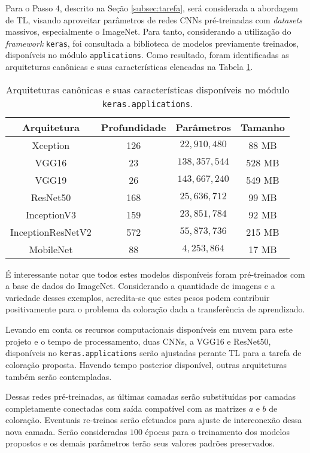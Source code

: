 Para o Passo 4, descrito na Seção \ref{subsec:tarefa}, será considerada a abordagem de TL, visando aproveitar parâmetros de redes CNNs pré-treinadas com \emph{datasets} massivos, especialmente o ImageNet. Para tanto, considerando a utilização do \emph{framework} \texttt{keras}, foi consultada a biblioteca de modelos previamente treinados, disponíveis no módulo \texttt{applications}. Como resultado, foram identificadas as arquiteturas canônicas e suas características elencadas na Tabela \ref{tab:cnns}.

\begin{table}[!ht]
	\caption{Arquiteturas canônicas e suas características disponíveis no módulo \texttt{keras.applications}.}
	\centering
	\begin{tabular}{c c c c}
		\toprule
		 Arquitetura & Profundidade & Parâmetros & Tamanho \\
		\midrule
		Xception & 126 & $22,910,480$ & 88 MB \\
		VGG16 & 23 & $138,357,544$ & 528 MB \\
		VGG19 & 26 & $143,667,240$ & 549 MB \\
		ResNet50 & 168 & $25,636,712$ & 99 MB \\
		InceptionV3 & 159 & $23,851,784$ & 92 MB \\
		InceptionResNetV2 & 572 & $55,873,736$ & 215 MB \\
		MobileNet & 88 & $4,253,864$ & 17 MB \\
		\bottomrule
	\end{tabular}

	\label{tab:cnns}
\end{table}

É interessante notar que todos estes modelos disponíveis foram pré-treinados com a base de dados do ImageNet. Considerando a quantidade de imagens e a variedade desses exemplos, acredita-se que estes pesos podem contribuir positivamente para o problema da coloração dada a transferência de aprendizado.

Levando em conta os recursos computacionais disponíveis em nuvem para este projeto e o tempo de processamento, duas CNNs, a VGG16 e ResNet50, disponíveis no \texttt{keras.applications} serão ajustadas perante TL para a tarefa de coloração proposta. Havendo tempo posterior disponível, outras arquiteturas também serão contempladas.

Dessas redes pré-treinadas, as últimas camadas serão substituídas por camadas completamente conectadas com saída compatível com as matrizes $a$ e $b$ de coloração. Eventuais re-treinos serão efetuados para ajuste de interconexão dessa nova camada. Serão consideradas $100$ épocas para o treinamento dos modelos propostos e os demais parâmetros terão seus valores padrões preservados.
